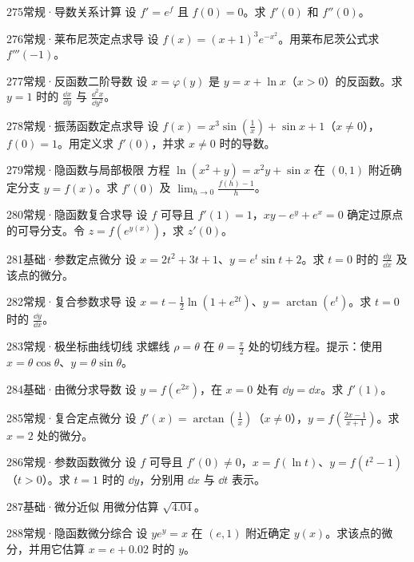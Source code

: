 \begin{exercise}{275}{常规·导数关系计算}
设 $f'=e^f$ 且 $f(0)=0$。求 $f'(0)$ 和 $f''(0)$。
\end{exercise}
\begin{exercise}{276}{常规·莱布尼茨定点求导}
设 $f(x)=(x+1)^3e^{-x^2}$。用莱布尼茨公式求 $f'''(-1)$。
\end{exercise}
\begin{exercise}{277}{常规·反函数二阶导数}
设 $x=\varphi(y)$ 是 $y=x+\ln x$（$x>0$）的反函数。求 $y=1$ 时的 $\frac{\dd x}{\dd y}$ 与 $\frac{\dd^2x}{\dd y^2}$。
\end{exercise}
\begin{exercise}{278}{常规·振荡函数定点求导}
设 $f(x)=x^3\sin(\frac{1}{x})+\sin x+1$（$x\ne0$），$f(0)=1$。用定义求 $f'(0)$，并求 $x\ne0$ 时的导数。
\end{exercise}
\begin{exercise}{279}{常规·隐函数与局部极限}
方程 $\ln(x^2+y)=x^2y+\sin x$ 在 $(0,1)$ 附近确定分支 $y=f(x)$。求 $f'(0)$ 及 $\lim_{h\to0}\frac{f(h)-1}{h}$。
\end{exercise}
\begin{exercise}{280}{常规·隐函数复合求导}
设 $f$ 可导且 $f'(1)=1$，$xy-e^y+e^x=0$ 确定过原点的可导分支。令 $z=f(e^{y(x)})$，求 $z'(0)$。
\end{exercise}
\begin{exercise}{281}{基础·参数定点微分}
设 $x=2t^2+3t+1$、$y=e^t\sin t+2$。求 $t=0$ 时的 $\frac{\dd y}{\dd x}$ 及该点的微分。
\end{exercise}
\begin{exercise}{282}{常规·复合参数求导}
设 $x=t-\frac12\ln(1+e^{2t})$、$y=\arctan(e^t)$。求 $t=0$ 时的 $\frac{\dd y}{\dd x}$。
\end{exercise}
\begin{exercise}{283}{常规·极坐标曲线切线}
求螺线 $\rho=\theta$ 在 $\theta=\frac{\pi}{2}$ 处的切线方程。提示：使用 $x=\theta\cos\theta$、$y=\theta\sin\theta$。
\end{exercise}
\begin{exercise}{284}{基础·由微分求导数}
设 $y=f(e^{2x})$，在 $x=0$ 处有 $\dd y=\dd x$。求 $f'(1)$。
\end{exercise}
\begin{exercise}{285}{常规·复合定点微分}
设 $f'(x)=\arctan(\frac{1}{x})$（$x\ne0$），$y=f(\frac{2x-1}{x+1})$。求 $x=2$ 处的微分。
\end{exercise}
\begin{exercise}{286}{常规·参数函数微分}
设 $f$ 可导且 $f'(0)\ne0$，$x=f(\ln t)$、$y=f(t^2-1)$（$t>0$）。求 $t=1$ 时的 $\dd y$，分别用 $\dd x$ 与 $\dd t$ 表示。
\end{exercise}
\begin{exercise}{287}{基础·微分近似}
用微分估算 $\sqrt{4.04}$。
\end{exercise}
\begin{exercise}{288}{常规·隐函数微分综合}
设 $ye^y=x$ 在 $(e,1)$ 附近确定 $y(x)$。求该点的微分，并用它估算 $x=e+0.02$ 时的 $y$。
\end{exercise}
